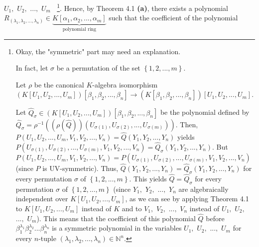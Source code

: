 \documentclass[12pt,final,notitlepage,onecolumn,german]{article}%
\begin{document}
$U_{1},$ $U_{2},$ $...,$ $U_{m}\ \ \ \ $\footnote{Okay, the "symmetric" part
may need an explanation.
\par
{}In fact, let $\sigma$ be a permutation of the set $\left\{
1,2,...,m\right\}  .$
\par
Let $\rho$ be the canonical $K$-algebra isomorphism $\left(  K\left[
U_{1},U_{2},...,U_{m}\right]  \right)  \left[  \beta_{1},\beta_{2}%
,...,\beta_{n}\right]  \rightarrow\left(  K\left[  \beta_{1},\beta
_{2},...,\beta_{n}\right]  \right)  \left[  U_{1},U_{2},...,U_{m}\right]  $.
\par
Let $\widehat{Q}_{\sigma}\in\left(  K\left[  U_{1},U_{2},...,U_{m}\right]
\right)  \left[  \beta_{1},\beta_{2},...,\beta_{n}\right]  $ be the polynomial
defined by $\widehat{Q}_{\sigma}=\rho^{-1}\left(  \left(  \rho\left(
\widehat{Q}\right)  \right)  \left(  U_{\sigma\left(  1\right)  }%
,U_{\sigma\left(  2\right)  },...,U_{\sigma\left(  m\right)  }\right)
\right)  .$ Then, $P\left(  U_{1},U_{2},...,U_{m},V_{1},V_{2},...,V_{n}%
\right)  =\widehat{Q}\left(  Y_{1},Y_{2},...,Y_{n}\right)  $ yields $P\left(
U_{\sigma\left(  1\right)  },U_{\sigma\left(  2\right)  },...,U_{\sigma\left(
m\right)  },V_{1},V_{2},...,V_{n}\right)  =\widehat{Q}_{\sigma}\left(
Y_{1},Y_{2},...,Y_{n}\right)  $. But $P\left(  U_{1},U_{2},...,U_{m}%
,V_{1},V_{2},...,V_{n}\right)  =P\left(  U_{\sigma\left(  1\right)
},U_{\sigma\left(  2\right)  },...,U_{\sigma\left(  m\right)  },V_{1}%
,V_{2},...,V_{n}\right)  $ (since $P$ is UV-symmetric). Thus, $\widehat
{Q}\left(  Y_{1},Y_{2},...,Y_{n}\right)  =\widehat{Q}_{\sigma}\left(
Y_{1},Y_{2},...,Y_{n}\right)  $ for every permutation $\sigma$ of $\left\{
1,2,...,m\right\}  $. This yields $\widehat{Q}=\widehat{Q}_{\sigma}$ for every
permutation $\sigma$ of $\left\{  1,2,...,m\right\}  $ (since $Y_{1},$
$Y_{2},$ $...,$ $Y_{n}$ are algebraically independent over $K\left[
U_{1},U_{2},...,U_{m}\right]  $, as we can see by applying Theorem 4.1 to
$K\left[  U_{1},U_{2},...,U_{m}\right]  $ instead of $K$ and to $V_{1},$
$V_{2},$ $...,$ $V_{n}$ instead of $U_{1},$ $U_{2},$ $...,$ $U_{m}$). This
means that the coefficient of this polynomial $\widehat{Q}$ before $\beta
_{1}^{\lambda_{1}}\beta_{2}^{\lambda_{2}}...\beta_{n}^{\lambda_{n}}$ is a
symmetric polynomial in the variables $U_{1},$ $U_{2},$ $...,$ $U_{m}$ for
every $n$-tuple $\left(  \lambda_{1},\lambda_{2},...,\lambda_{n}\right)
\in\mathbb{N}^{n}$.}. Hence, by Theorem 4.1 \textbf{(a)}, there exists a
polynomial $R_{\left(  \lambda_{1},\lambda_{2},...,\lambda_{n}\right)  }%
\in\underbrace{K\left[  \alpha_{1},\alpha_{2},...,\alpha_{m}\right]
}_{\text{polynomial ring}}$ such that the coefficient of the polynomial
\end{document}

